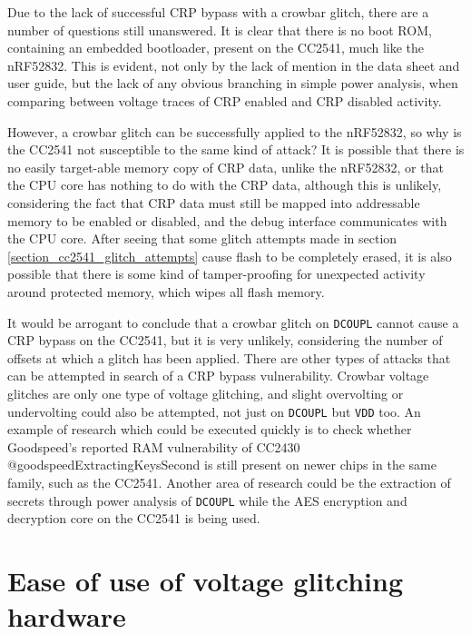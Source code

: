 Due to the lack of successful CRP bypass with a crowbar glitch, there
are a number of questions still unanswered. It is clear that there is no
boot ROM, containing an embedded bootloader, present on the CC2541, much
like the nRF52832. This is evident, not only by the lack of mention in
the data sheet and user guide, but the lack of any obvious branching in
simple power analysis, when comparing between voltage traces of CRP
enabled and CRP disabled activity.

However, a crowbar glitch can be successfully applied to the nRF52832,
so why is the CC2541 not susceptible to the same kind of attack? It is
possible that there is no easily target-able memory copy of CRP data,
unlike the nRF52832, or that the CPU core has nothing to do with the CRP
data, although this is unlikely, considering the fact that CRP data must
still be mapped into addressable memory to be enabled or disabled, and
the debug interface communicates with the CPU core. After seeing that
some glitch attempts made in section
\ref{section_cc2541_glitch_attempts} cause flash to be completely
erased, it is also possible that there is some kind of tamper-proofing
for unexpected activity around protected memory, which wipes all flash
memory.

It would be arrogant to conclude that a crowbar glitch on
\texttt{DCOUPL} cannot cause a CRP bypass on the CC2541, but it is very
unlikely, considering the number of offsets at which a glitch has been
applied. There are other types of attacks that can be attempted in
search of a CRP bypass vulnerability. Crowbar voltage glitches are only
one type of voltage glitching, and slight overvolting or undervolting
could also be attempted, not just on \texttt{DCOUPL} but \texttt{VDD}
too. An example of research which could be executed quickly is to check
whether Goodspeed's reported RAM vulnerability of CC2430
@goodspeedExtractingKeysSecond is still present on newer chips in the
same family, such as the CC2541. Another area of research could be the
extraction of secrets through power analysis of \texttt{DCOUPL} while
the AES encryption and decryption core on the CC2541 is being used.

\hypertarget{ease-of-use-of-voltage-glitching-hardware}{%
\section{\texorpdfstring{Ease of use of voltage glitching
hardware\label{section_ease_of_use}}{Ease of use of voltage glitching hardware}}\label{ease-of-use-of-voltage-glitching-hardware}}

